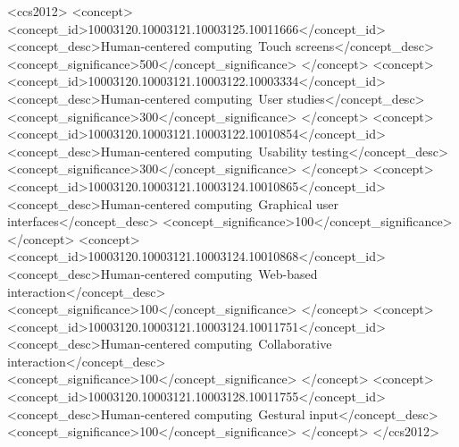 \documentclass[sigchi-a, authorversion]{acmart}
\begin{document}
\author{Jacinto C. Nascimento}

\author{Alfredo Ferreira}

\author{Daniel Gon\c{c}alves}

\renewcommand{\shortauthors}{Calisto et al.}


%
%
\begin{CCSXML}
<ccs2012>
<concept>
<concept_id>10003120.10003121.10003125.10011666</concept_id>
<concept_desc>Human-centered computing~Touch screens</concept_desc>
<concept_significance>500</concept_significance>
</concept>
<concept>
<concept_id>10003120.10003121.10003122.10003334</concept_id>
<concept_desc>Human-centered computing~User studies</concept_desc>
<concept_significance>300</concept_significance>
</concept>
<concept>
<concept_id>10003120.10003121.10003122.10010854</concept_id>
<concept_desc>Human-centered computing~Usability testing</concept_desc>
<concept_significance>300</concept_significance>
</concept>
<concept>
<concept_id>10003120.10003121.10003124.10010865</concept_id>
<concept_desc>Human-centered computing~Graphical user interfaces</concept_desc>
<concept_significance>100</concept_significance>
</concept>
<concept>
<concept_id>10003120.10003121.10003124.10010868</concept_id>
<concept_desc>Human-centered computing~Web-based interaction</concept_desc>
<concept_significance>100</concept_significance>
</concept>
<concept>
<concept_id>10003120.10003121.10003124.10011751</concept_id>
<concept_desc>Human-centered computing~Collaborative interaction</concept_desc>
<concept_significance>100</concept_significance>
</concept>
<concept>
<concept_id>10003120.10003121.10003128.10011755</concept_id>
<concept_desc>Human-centered computing~Gestural input</concept_desc>
<concept_significance>100</concept_significance>
</concept>
</ccs2012>
\end{CCSXML}
\end{document}
